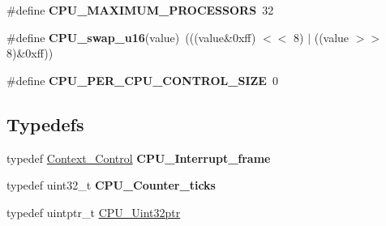 \begin{DoxyCompactItemize}
\#define {\bfseries C\+P\+U\+\_\+\+M\+A\+X\+I\+M\+U\+M\+\_\+\+P\+R\+O\+C\+E\+S\+S\+O\+RS}~32
\item 
\mbox{\label{group__RTEMSScoreCPUEpiphany_ga1936ecb0107e5875a7b538374c1f621d}} 
\#define {\bfseries C\+P\+U\+\_\+swap\+\_\+u16}(value)~(((value\&0xff) $<$$<$ 8) $\vert$ ((value $>$$>$ 8)\&0xff))
\item 
\mbox{\label{group__RTEMSScoreCPUEpiphany_gaf8e38596ad3db49995fd8eb9fb4e86b2}} 
\#define {\bfseries C\+P\+U\+\_\+\+P\+E\+R\+\_\+\+C\+P\+U\+\_\+\+C\+O\+N\+T\+R\+O\+L\+\_\+\+S\+I\+ZE}~0
\end{DoxyCompactItemize}
\subsection*{Typedefs}
\begin{DoxyCompactItemize}
\item 
\mbox{\label{group__RTEMSScoreCPUEpiphany_ga60471cadc5146e2a145df7dc10590500}} 
typedef \mbox{\hyperlink{structContext__Control}{Context\+\_\+\+Control}} {\bfseries C\+P\+U\+\_\+\+Interrupt\+\_\+frame}
\item 
\mbox{\label{group__RTEMSScoreCPUEpiphany_ga67f8550aad58bccb6fcb4589894444ad}} 
typedef uint32\+\_\+t {\bfseries C\+P\+U\+\_\+\+Counter\+\_\+ticks}
\item 
typedef uintptr\+\_\+t \mbox{\hyperlink{group__RTEMSScoreCPUEpiphany_ga9fca17f81f850e128fcc8ed5b87ff2ab}{C\+P\+U\+\_\+\+Uint32ptr}}
\end{DoxyCompactItemize}
